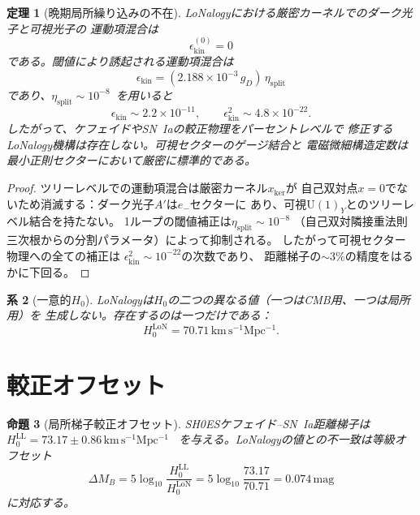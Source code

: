 \documentclass[12pt]{article}
\theoremstyle{plain}
\newtheorem{theorem}{定理}[section]
\newtheorem{proposition}[theorem]{命題}
\newtheorem{corollary}[theorem]{系}
\theoremstyle{definition}
\numberwithin{equation}{section}
\newcommand{\kker}{\mathrm{ker}}
\newcommand{\LoN}{\mathrm{LoN}}
\begin{document}
\begin{theorem}[晩期局所繰り込みの不在]\label{thm:norenorm}
LoNalogyにおける厳密カーネルでのダーク光子と可視光子の
運動項混合は
\begin{equation}
\epsilon_{\mathrm{kin}}^{(0)} = 0
\end{equation}
である。閾値により誘起される運動項混合は
\begin{equation}
\epsilon_{\mathrm{kin}} = (2.188\times10^{-3}\,g_D)\,\eta_{\mathrm{split}}
\end{equation}
であり、$\eta_{\mathrm{split}}\sim10^{-8}$~\cite{ParticleCosmo}を用いると
\begin{equation}
\epsilon_{\mathrm{kin}} \sim 2.2\times10^{-11},
\qquad
\epsilon_{\mathrm{kin}}^2 \sim 4.8\times10^{-22}.
\end{equation}
したがって、ケフェイドやSN~Iaの較正物理をパーセントレベルで
修正するLoNalogy機構は存在しない。可視セクターのゲージ結合と
電磁微細構造定数は最小正則セクターにおいて厳密に標準的である。
\end{theorem}

\begin{proof}
ツリーレベルでの運動項混合は厳密カーネル$x_{\kker}$が
自己双対点$x=0$でないため消滅する：ダーク光子$A'$は$e_-$セクターに
あり、可視$\mathrm{U}(1)_Y$とのツリーレベル結合を持たない。
1ループの閾値補正は$\eta_{\mathrm{split}}\sim10^{-8}$
（自己双対隣接重法則三次根からの分割パラメータ）によって抑制される。
したがって可視セクター物理への全ての補正は
$\epsilon_{\mathrm{kin}}^2\sim10^{-22}$の次数であり、
距離梯子の$\sim3\%$の精度をはるかに下回る。
\end{proof}

\begin{corollary}[一意的$H_0$]\label{cor:uniqueH0}
LoNalogyは$H_0$の二つの異なる値（一つはCMB用、一つは局所用）を
生成しない。存在するのは一つだけである：
\begin{equation}
\boxed{H_0^{\LoN} = 70.71\,\mathrm{km\,s^{-1}Mpc^{-1}}.}
\end{equation}
\end{corollary}


\section{較正オフセット}\label{sec:calibration}

\begin{proposition}[局所梯子較正オフセット]\label{prop:offset}
SH0ESケフェイド--SN~Ia距離梯子は
$H_0^{\mathrm{LL}}=73.17\pm0.86\,\mathrm{km\,s^{-1}Mpc^{-1}}$~\cite{SH0ES2022,Breuval2024}
を与える。LoNalogyの値との不一致は等級オフセット
\begin{equation}
\Delta M_B = 5\log_{10}\frac{H_0^{\mathrm{LL}}}{H_0^{\LoN}}
= 5\log_{10}\frac{73.17}{70.71}
= 0.074\,\mathrm{mag}
\end{equation}
に対応する。
\end{proposition}
\end{document}
